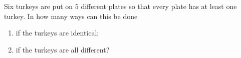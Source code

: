 Six turkeys are put on $5$ different plates so that every plate has at least one turkey. In how many ways can this be done
\begin{enumerate}
\item[(a)] if the turkeys are identical;
\item[(b)] if the turkeys are all different?
\end{enumerate}
